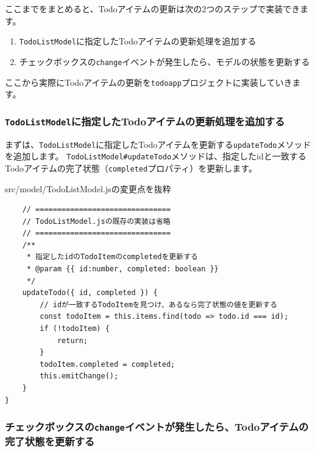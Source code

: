 ここまでをまとめると、Todoアイテムの更新は次の2つのステップで実装できます。

\begin{enumerate}
\def\labelenumi{\arabic{enumi}.}
\item
  \texttt{TodoListModel}に指定したTodoアイテムの更新処理を追加する
\item
  チェックボックスの\texttt{change}イベントが発生したら、モデルの状態を更新する
\end{enumerate}

ここから実際にTodoアイテムの更新を\texttt{todoapp}プロジェクトに実装していきます。

\hypertarget{TodoListModel-updateTodo}{%
\subsubsection{\texorpdfstring{\texttt{TodoListModel}に指定したTodoアイテムの更新処理を追加する}{TodoListModelに指定したTodoアイテムの更新処理を追加する}}\label{TodoListModel-updateTodo}}

まずは、\texttt{TodoListModel}に指定したTodoアイテムを更新する\texttt{updateTodo}メソッドを追加します。
\texttt{TodoListModel\#updateTodo}メソッドは、指定したidと一致するTodoアイテムの完了状態（\texttt{completed}プロパティ）を更新します。

\begin{listtitle}
src/model/TodoListModel.jsの変更点を抜粋
\end{listtitle}
\begin{lstlisting}
    // ===============================
    // TodoListModel.jsの既存の実装は省略
    // ===============================
    /**
     * 指定したidのTodoItemのcompletedを更新する
     * @param {{ id:number, completed: boolean }}
     */
    updateTodo({ id, completed }) {
        // idが一致するTodoItemを見つけ、あるなら完了状態の値を更新する
        const todoItem = this.items.find(todo => todo.id === id);
        if (!todoItem) {
            return;
        }
        todoItem.completed = completed;
        this.emitChange();
    }
}
\end{lstlisting}
\listend

\hypertarget{onChange-update-model}{%
\subsubsection{\texorpdfstring{チェックボックスの\texttt{change}イベントが発生したら、Todoアイテムの完了状態を更新する}{チェックボックスのchangeイベントが発生したら、Todoアイテムの完了状態を更新する}}\label{onChange-update-model}}

